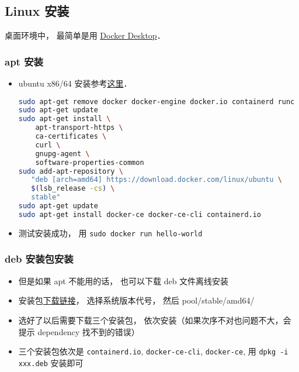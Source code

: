 
\begin{issues}
\issueDraft
\end{issues}

\subsection{Linux 安装}
桌面环境中， 最简单是用 \href{https://docs.docker.com/desktop/install/ubuntu/#install-docker-desktop}{Docker Desktop}．

\subsubsection{apt 安装}
\begin{itemize}
\item ubuntu x86/64 安装参考\href{https://docs.docker.com/install/linux/docker-ce/ubuntu/}{这里}．
\begin{lstlisting}[language=bash]
sudo apt-get remove docker docker-engine docker.io containerd runc
sudo apt-get update
sudo apt-get install \
    apt-transport-https \
    ca-certificates \
    curl \
    gnupg-agent \
    software-properties-common
sudo add-apt-repository \
   "deb [arch=amd64] https://download.docker.com/linux/ubuntu \
   $(lsb_release -cs) \
   stable"
sudo apt-get update
sudo apt-get install docker-ce docker-ce-cli containerd.io
\end{lstlisting}
\item 测试安装成功， 用 \verb`sudo docker run hello-world`
\end{itemize}

\subsubsection{deb 安装包安装}
\begin{itemize}
\item 但是如果 apt 不能用的话， 也可以下载 deb 文件离线安装
\item 安装包\href{https://download.docker.com/linux/ubuntu/dists/}{下载链接}， 选择系统版本代号， 然后 pool/stable/amd64/
\item 选好了以后需要下载三个安装包， 依次安装（如果次序不对也问题不大，会提示 dependency 找不到的错误）
\item 三个安装包依次是 \verb|containerd.io|, \verb|docker-ce-cli|, \verb|docker-ce|, 用 \verb`dpkg -i xxx.deb` 安装即可
\end{itemize}

